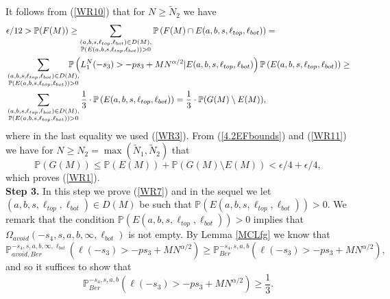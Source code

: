 It follows from (\ref{WR10}) that for $N \geq \tilde{N}_2$ we have
\begin{equation}\label{WR11}
\begin{split}
& \epsilon/12 > \mathbb{P}(F(M)) \geq \sum_{\substack{(a,b,s,\ell_{top}, \ell_{bot})\in D(M), \\ \mathbb{P}(E(a,b,s, \ell_{top}, \ell_{bot})) > 0}} \mathbb{P}\left(F(M)\cap E(a,b,s, \ell_{top}, \ell_{bot})\right) = \\
&\sum_{\substack{(a,b,s,\ell_{top}, \ell_{bot})\in D(M), \\ \mathbb{P}(E(a,b,s, \ell_{top}, \ell_{bot})) > 0}} \hspace{-5mm} \mathbb{P}\left( L_1^N(-s_3) > -ps_3 + MN^{\alpha/2} \vert  E(a,b,s,\ell_{top}, \ell_{bot}) \right )\mathbb{P}\left(E(a,b,s,\ell_{top}, \ell_{bot}) \right) \geq \\
& \sum_{\substack{(a,b,s,\ell_{top}, \ell_{bot})\in D(M), \\ \mathbb{P}(E(a,b,s, \ell_{top}, \ell_{bot})) > 0}} \frac{1}{3} \cdot \mathbb{P}\left(E(a,b,s,\ell_{top}, \ell_{bot}) \right)  =  \frac{1}{3} \cdot \mathbb{P}(G(M)\setminus E(M)),
\end{split}
\end{equation}
where in the last equality we used (\ref{WR3}). From (\ref{4.2EFbounds}) and (\ref{WR11}) we have for $N \geq N_2 = \max(\tilde{N}_1, \tilde{N}_2)$  that 
$$\mathbb{P}(G(M)) \leq \mathbb{P}(E(M)) + \mathbb{P}(G(M)\setminus E(M))< \epsilon/4 + \epsilon/4,$$
which proves (\ref{WR1}).\\


{\bf \raggedleft Step 3.} In this step we prove (\ref{WR7}) and in the sequel we let $(a,b,s,\ell_{top},\ell_{bot})\in D(M)$ be such that $\mathbb{P}( E(a,b,s,\ell_{top},\ell_{bot})) > 0$. We remark that the condition $\mathbb{P}( E(a,b,s,\ell_{top},\ell_{bot})) >0 $ implies that $\Omega_{avoid}({-s_4,s,a,b,\infty,\ell_{bot}})$ is not empty. By Lemma \ref{MCLfg} we know that 
$$\mathbb{P}^{-s_4,s,a,b,\infty,\ell_{bot}}_{avoid, Ber}\left(\ell(-s_3) > -ps_3 + MN^{\alpha/2}\right) \geq \mathbb{P}^{-s_4,s,a,b}_{ Ber}\left(\ell(-s_3) > -ps_3 + MN^{\alpha/2}\right),$$
and so it suffices to show that 
\begin{equation}\label{WT0}
\mathbb{P}^{-s_4,s,a,b}_{Ber}\left(\ell(-s_3) > -ps_3 + MN^{\alpha/2}\right) \geq \frac{1}{3}.
\end{equation}

